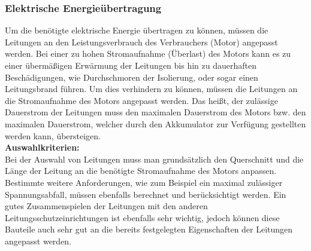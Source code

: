 \newpage



\subsubsection{Elektrische Energieübertragung}
\label{Elektrische_Energieuebertragung}
Um die benötigte elektrische Energie übertragen zu können, müssen die Leitungen an den Leistungsverbrauch des Verbrauchers (Motor) angepasst werden. Bei einer zu hohen Stromaufnahme (Überlast) des Motors kann es zu einer übermäßigen Erwärmung der Leitungen bis hin zu dauerhaften Beschädigungen, wie Durchschmoren der Isolierung, oder sogar einen Leitungsbrand führen. Um dies verhindern zu können, müssen die Leitungen an die Stromaufnahme des Motors angepasst werden. Das heißt, der zulässige Dauerstrom der Leitungen muss den maximalen Dauerstrom des Motors bzw. den maximalen Dauerstrom, welcher durch den Akkumulator zur Verfügung gestellten werden kann, übersteigen.
\\[5mm]

\textbf{Auswahlkriterien:}
\\[2mm]
Bei der Auswahl von Leitungen muss man grundsätzlich den Querschnitt und die Länge der Leitung an die benötigte Stromaufnahme des Motors anpassen. Bestimmte weitere Anforderungen, wie zum Beispiel ein maximal zulässiger Spannungsabfall, müssen ebenfalls berechnet und berücksichtigt werden. Ein gutes Zusammenspielen der Leitungen mit den anderen Leitungsschutzeinrichtungen ist ebenfalls sehr wichtig, jedoch können diese Bauteile auch sehr gut an die bereits festgelegten Eigenschaften der Leitungen angepasst werden.
\\[5mm]

